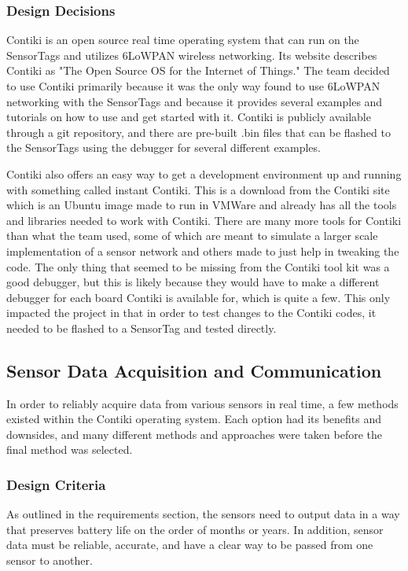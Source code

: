 \documentclass[PPFS.tex]{template/subfiles}
\begin{document}
\subsubsection{Design Decisions}
Contiki is an open source real time operating system that can run on the SensorTags and utilizes 6LoWPAN wireless networking. Its website describes Contiki as "The Open Source OS for the Internet of Things." The team decided to use Contiki primarily because it was the only way found to use 6LoWPAN networking with the SensorTags and because it provides several examples and tutorials on how to use and get started with it. Contiki is publicly available through a git repository, and there are pre-built .bin files that can be flashed to the SensorTags using the debugger for several different examples.

Contiki also offers an easy way to get a development environment up and running with something called instant Contiki. This is a download from the Contiki site which is an Ubuntu image made to run in VMWare and already has all the tools and libraries needed to work with Contiki. There are many more tools for Contiki than what the team used, some of which are meant to simulate a larger scale implementation of a sensor network and others made to just help in tweaking the code. The only thing that seemed to be missing from the Contiki tool kit was a good debugger, but this is likely because they would have to make a different debugger for each board Contiki is available for, which is quite a few. This only impacted the project in that in order to test changes to the Contiki codes, it needed to be flashed to a SensorTag and tested directly.

\subsection{Sensor Data Acquisition and Communication}
In order to reliably acquire data from various sensors in real time, a few methods existed within the Contiki operating system. Each option had its benefits and downsides, and many different methods and approaches were taken before the final method was selected.

\subsubsection{Design Criteria}
As outlined in the requirements section, the sensors need to output data in a way that preserves battery life on the order of months or years. In addition, sensor data must be reliable, accurate, and have a clear way to be passed from one sensor to another.
\end{document}
